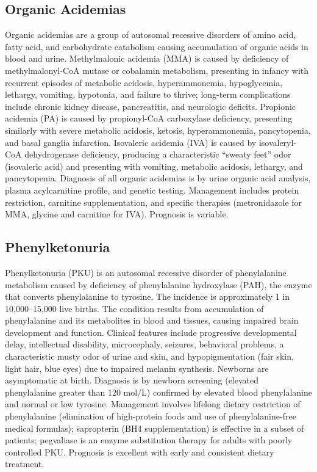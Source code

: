\subsection{Organic Acidemias}
\label{sec:Organic Acidemias}
Organic acidemias are a group of autosomal recessive disorders of amino acid, fatty acid, and carbohydrate catabolism causing accumulation of organic acids in blood and urine. Methylmalonic acidemia (MMA) is caused by deficiency of methylmalonyl-CoA mutase or cobalamin metabolism, presenting in infancy with recurrent episodes of metabolic acidosis, hyperammonemia, hypoglycemia, lethargy, vomiting, hypotonia, and failure to thrive; long-term complications include chronic kidney disease, pancreatitis, and neurologic deficits. Propionic acidemia (PA) is caused by propionyl-CoA carboxylase deficiency, presenting similarly with severe metabolic acidosis, ketosis, hyperammonemia, pancytopenia, and basal ganglia infarction. Isovaleric acidemia (IVA) is caused by isovaleryl-CoA dehydrogenase deficiency, producing a characteristic ``sweaty feet'' odor (isovaleric acid) and presenting with vomiting, metabolic acidosis, lethargy, and pancytopenia. Diagnosis of all organic acidemias is by urine organic acid analysis, plasma acylcarnitine profile, and genetic testing. Management includes protein restriction, carnitine supplementation, and specific therapies (metronidazole for MMA, glycine and carnitine for IVA). Prognosis is variable.

\subsection{Phenylketonuria}
\label{sec:Phenylketonuria}
Phenylketonuria (PKU) is an autosomal recessive disorder of phenylalanine metabolism caused by deficiency of phenylalanine hydroxylase (PAH), the enzyme that converts phenylalanine to tyrosine. The incidence is approximately 1 in 10,000--15,000 live births. The condition results from accumulation of phenylalanine and its metabolites in blood and tissues, causing impaired brain development and function. Clinical features include progressive developmental delay, intellectual disability, microcephaly, seizures, behavioral problems, a characteristic musty odor of urine and skin, and hypopigmentation (fair skin, light hair, blue eyes) due to impaired melanin synthesis. Newborns are asymptomatic at birth. Diagnosis is by newborn screening (elevated phenylalanine greater than 120 \textmu mol/L) confirmed by elevated blood phenylalanine and normal or low tyrosine. Management involves lifelong dietary restriction of phenylalanine (elimination of high-protein foods and use of phenylalanine-free medical formulas); sapropterin (BH4 supplementation) is effective in a subset of patients; pegvaliase is an enzyme substitution therapy for adults with poorly controlled PKU. Prognosis is excellent with early and consistent dietary treatment.

